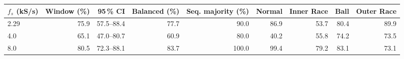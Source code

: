 \begin{tabular}{@{}lrrrrrrrr@{}}
\toprule
$f_s$ (kS/s) & Window (\%) & 95\,\% CI & Balanced (\%) & Seq. majority (\%) & Normal & Inner Race & Ball & Outer Race \\
\midrule
2.29 & 75.9 & 57.5--88.4 & 77.7 & 90.0 & 86.9 & 53.7 & 80.4 & 89.9 \\
4.0 & 65.1 & 47.0--80.7 & 60.9 & 80.0 & 40.2 & 55.8 & 74.2 & 73.5 \\
8.0 & 80.5 & 72.3--88.1 & 83.7 & 100.0 & 99.4 & 79.2 & 83.1 & 73.1 \\
\bottomrule
\end{tabular}
